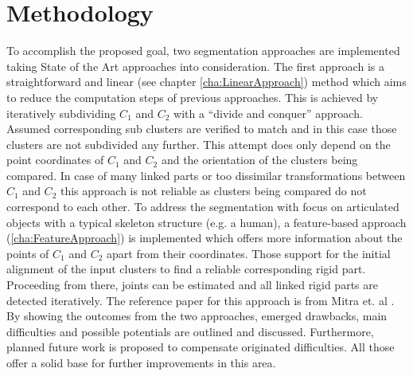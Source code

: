 \section{Methodology}

To accomplish the proposed goal, two segmentation approaches are implemented taking State of the Art approaches into consideration. The first approach is a straightforward and linear (see chapter \ref{cha:LinearApproach}) method which aims to reduce the computation steps of previous approaches. This is achieved by iteratively subdividing $C_1$ and $C_2$ with a ``divide and conquer'' approach. Assumed corresponding sub clusters are verified to match and in this case those clusters are not subdivided any further. This attempt does only depend on the point coordinates of $C_1$ and $C_2$ and the orientation of the clusters being compared. In case of many linked parts or too dissimilar transformations between $C_1$ and $C_2$ this approach is not reliable as clusters being compared do not correspond to each other. To address the segmentation with focus on articulated objects with a typical skeleton structure (e.g. a human), a feature-based approach (\ref{cha:FeatureApproach}) is implemented which offers more information about the points of $C_1$ and $C_2$ apart from their coordinates. Those support for the initial alignment of the input clusters to find a reliable corresponding rigid part. Proceeding from there, joints can be estimated and all linked rigid parts are detected iteratively. The reference paper for this approach is from Mitra et. al \cite{Mitra07}. By showing the outcomes from the two approaches, emerged drawbacks, main difficulties and possible potentials are outlined and discussed. Furthermore, planned future work is proposed to compensate originated difficulties. All those offer a solid base for further improvements in this area. 




